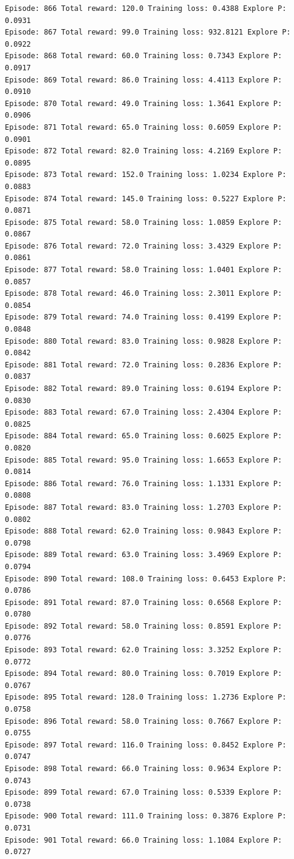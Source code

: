 \documentclass[11pt]{article}
\begin{document}
\begin{Verbatim}[commandchars=\\\{\}]
Episode: 866 Total reward: 120.0 Training loss: 0.4388 Explore P: 0.0931
Episode: 867 Total reward: 99.0 Training loss: 932.8121 Explore P: 0.0922
Episode: 868 Total reward: 60.0 Training loss: 0.7343 Explore P: 0.0917
Episode: 869 Total reward: 86.0 Training loss: 4.4113 Explore P: 0.0910
Episode: 870 Total reward: 49.0 Training loss: 1.3641 Explore P: 0.0906
Episode: 871 Total reward: 65.0 Training loss: 0.6059 Explore P: 0.0901
Episode: 872 Total reward: 82.0 Training loss: 4.2169 Explore P: 0.0895
Episode: 873 Total reward: 152.0 Training loss: 1.0234 Explore P: 0.0883
Episode: 874 Total reward: 145.0 Training loss: 0.5227 Explore P: 0.0871
Episode: 875 Total reward: 58.0 Training loss: 1.0859 Explore P: 0.0867
Episode: 876 Total reward: 72.0 Training loss: 3.4329 Explore P: 0.0861
Episode: 877 Total reward: 58.0 Training loss: 1.0401 Explore P: 0.0857
Episode: 878 Total reward: 46.0 Training loss: 2.3011 Explore P: 0.0854
Episode: 879 Total reward: 74.0 Training loss: 0.4199 Explore P: 0.0848
Episode: 880 Total reward: 83.0 Training loss: 0.9828 Explore P: 0.0842
Episode: 881 Total reward: 72.0 Training loss: 0.2836 Explore P: 0.0837
Episode: 882 Total reward: 89.0 Training loss: 0.6194 Explore P: 0.0830
Episode: 883 Total reward: 67.0 Training loss: 2.4304 Explore P: 0.0825
Episode: 884 Total reward: 65.0 Training loss: 0.6025 Explore P: 0.0820
Episode: 885 Total reward: 95.0 Training loss: 1.6653 Explore P: 0.0814
Episode: 886 Total reward: 76.0 Training loss: 1.1331 Explore P: 0.0808
Episode: 887 Total reward: 83.0 Training loss: 1.2703 Explore P: 0.0802
Episode: 888 Total reward: 62.0 Training loss: 0.9843 Explore P: 0.0798
Episode: 889 Total reward: 63.0 Training loss: 3.4969 Explore P: 0.0794
Episode: 890 Total reward: 108.0 Training loss: 0.6453 Explore P: 0.0786
Episode: 891 Total reward: 87.0 Training loss: 0.6568 Explore P: 0.0780
Episode: 892 Total reward: 58.0 Training loss: 0.8591 Explore P: 0.0776
Episode: 893 Total reward: 62.0 Training loss: 3.3252 Explore P: 0.0772
Episode: 894 Total reward: 80.0 Training loss: 0.7019 Explore P: 0.0767
Episode: 895 Total reward: 128.0 Training loss: 1.2736 Explore P: 0.0758
Episode: 896 Total reward: 58.0 Training loss: 0.7667 Explore P: 0.0755
Episode: 897 Total reward: 116.0 Training loss: 0.8452 Explore P: 0.0747
Episode: 898 Total reward: 66.0 Training loss: 0.9634 Explore P: 0.0743
Episode: 899 Total reward: 67.0 Training loss: 0.5339 Explore P: 0.0738
Episode: 900 Total reward: 111.0 Training loss: 0.3876 Explore P: 0.0731
Episode: 901 Total reward: 66.0 Training loss: 1.1084 Explore P: 0.0727

\end{Verbatim}
\end{document}
